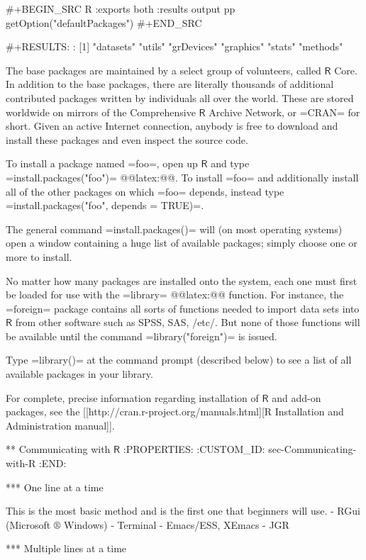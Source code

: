 #+BEGIN_SRC R :exports both :results output pp
getOption("defaultPackages")
#+END_SRC

#+RESULTS:
: [1] "datasets"  "utils"     "grDevices" "graphics"  "stats"     "methods"

The base packages are maintained by a select group of volunteers,
called \(\mathsf{R}\) Core. In addition to the base packages, there
are literally thousands of additional contributed packages written by
individuals all over the world. These are stored worldwide on mirrors
of the Comprehensive \(\mathsf{R}\) Archive Network, or =CRAN= for
short. Given an active Internet connection, anybody is free to
download and install these packages and even inspect the source code.

To install a package named =foo=, open up \(\mathsf{R}\) and type
=install.packages("foo")=
@@latex:@@. To
install =foo= and additionally install all of the other packages on
which =foo= depends, instead type =install.packages("foo", depends =
TRUE)=.

The general command =install.packages()= will (on most operating
systems) open a window containing a huge list of available packages;
simply choose one or more to install.

No matter how many packages are installed onto the system, each one
must first be loaded for use with the
=library= @@latex:@@ function. For instance, the
=foreign= package \cite{foreign} contains all sorts of functions
needed to import data sets into \(\mathsf{R}\) from other software
such as SPSS, SAS, /etc/. But none of those functions will be
available until the command =library("foreign")= is issued.

Type =library()= at the command prompt (described below) to see a list
of all available packages in your library.

For complete, precise information regarding installation of
\(\mathsf{R}\) and add-on packages, see the [[http://cran.r-project.org/manuals.html][R Installation and Administration manual]].

** Communicating with \(\mathsf{R}\)
:PROPERTIES:
:CUSTOM_ID: sec-Communicating-with-R
:END:

*** One line at a time

This is the most basic method and is the first one that beginners will use.
- RGui (Microsoft \(\circledR\) Windows)
- Terminal
- Emacs/ESS, XEmacs
- JGR

*** Multiple lines at a time

